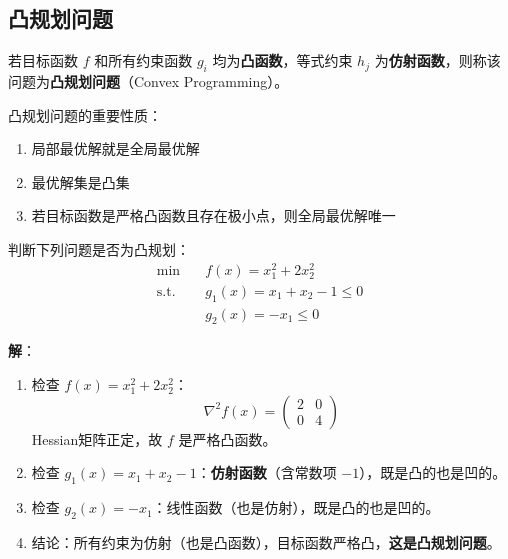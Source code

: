 \subsection{凸规划问题}

\begin{definition}[凸规划]
若目标函数 $f$ 和所有约束函数 $g_i$ 均为\textbf{凸函数}，等式约束 $h_j$ 为\textbf{仿射函数}，则称该问题为\textbf{凸规划问题}（Convex Programming）。
\end{definition}

\begin{property}[凸规划的优势]
凸规划问题的重要性质：
\begin{enumerate}[label=(\arabic*)]
    \item 局部最优解就是全局最优解
    \item 最优解集是凸集
    \item 若目标函数是严格凸函数且存在极小点，则全局最优解唯一
\end{enumerate}
\end{property}

\begin{example}[判断是否为凸规划]
判断下列问题是否为凸规划：
\[
\begin{aligned}
\min\quad & f(x) = x_1^2 + 2x_2^2 \\
\text{s.t.}\quad & g_1(x) = x_1 + x_2 - 1 \leq 0 \\
& g_2(x) = -x_1 \leq 0
\end{aligned}
\]

\textbf{解}：
\begin{enumerate}[label=Step \arabic*:, leftmargin=2em]
    \item 检查 $f(x) = x_1^2 + 2x_2^2$：
    \[
    \nabla^2 f(x) = \begin{pmatrix} 2 & 0 \\ 0 & 4 \end{pmatrix}
    \]
    Hessian矩阵正定，故 $f$ 是严格凸函数。
    
    \item 检查 $g_1(x) = x_1 + x_2 - 1$：\textbf{仿射函数}（含常数项 $-1$），既是凸的也是凹的。
    
    \item 检查 $g_2(x) = -x_1$：线性函数（也是仿射），既是凸的也是凹的。
    
    \item 结论：所有约束为仿射（也是凸函数），目标函数严格凸，\textbf{这是凸规划问题}。
\end{enumerate}
\end{example}


